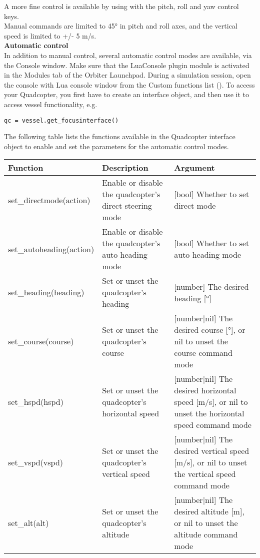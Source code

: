 \documentclass[Orbiter User Manual.tex]{subfiles}
\begin{document}
\noindent
A more fine control is available by using \Ctrl with the pitch, roll and yaw control keys.\\
Manual commands are limited to 45° in pitch and roll axes, and the vertical speed is limited to +/- 5 m/s.\\

\noindent
\textbf{Automatic control}\\
In addition to manual control, several automatic control modes are available, via the Console window. Make sure that the LuaConsole plugin module is activated in the Modules tab of the Orbiter Launchpad. During a simulation session, open the console with Lua console window from the Custom functions list (\Ctrl{}). To access your Quadcopter, you first have to create an interface object, and then use it to access vessel functionality, e.g.

\begin{lstlisting}[language=OSFS]
qc = vessel.get_focusinterface()
\end{lstlisting}

\noindent
The following table lists the functions available in the Quadcopter interface object to enable and set the parameters for the automatic control modes.

	\begin{longtable}{ |p{}|p{}|p{}| }
	\hline\rule{0pt}{2ex}
	\textbf{Function} & \textbf{Description} & \textbf{Argument}\\
	\hline\rule{0pt}{2ex}
	set\_directmode(action) & Enable or disable the quadcopter's direct steering mode & [bool] Whether to set direct mode\\
	\hline\rule{0pt}{2ex}
	set\_autoheading(action) & Enable or disable the quadcopter's auto heading mode & [bool] Whether to set auto heading mode\\
	\hline\rule{0pt}{2ex}
	set\_heading(heading) & Set or unset the quadcopter's heading & [number] The desired heading [°]\\
	\hline\rule{0pt}{2ex}
	set\_course(course) & Set or unset the quadcopter's course & [number$\vert$nil] The desired course [°], or nil to unset the course command mode\\
	\hline\rule{0pt}{2ex}
	set\_hspd(hspd) & Set or unset the quadcopter's horizontal speed & [number$\vert$nil] The desired horizontal speed [m/s], or nil to unset the horizontal speed command mode\\
	\hline\rule{0pt}{2ex}
	set\_vspd(vspd) & Set or unset the quadcopter's vertical speed & [number$\vert$nil] The desired vertical speed [m/s], or nil to unset the vertical speed command mode\\
	\hline\rule{0pt}{2ex}
	set\_alt(alt) & Set or unset the quadcopter's altitude & [number$\vert$nil] The desired altitude [m], or nil to unset the altitude command mode\\
	\hline
	\end{longtable}
\end{document}
